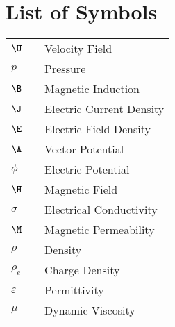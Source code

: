 \chapter*{List of Symbols}
\vspace{-1em}
\begin{table}[ht!]\begin{adjustbox}{max width=\TW}\begin{tabular}{ l c l }
$\U$                  & \hspace{3em} &    Velocity Field                \\
$p$                   & \hspace{3em} &    Pressure                      \\
$\B$                  & \hspace{3em} &    Magnetic Induction            \\
$\J$                  & \hspace{3em} &    Electric Current Density      \\
$\E$                  & \hspace{3em} &    Electric Field Density        \\
$\A$                  & \hspace{3em} &    Vector Potential              \\
$\phi$                & \hspace{3em} &    Electric Potential            \\
$\H$                  & \hspace{3em} &    Magnetic Field                \\
$\sigma$              & \hspace{3em} &    Electrical Conductivity       \\
$\M$                  & \hspace{3em} &    Magnetic Permeability         \\
$\rho$                & \hspace{3em} &    Density                       \\
$\rho_e$              & \hspace{3em} &    Charge Density                \\
$\varepsilon$         & \hspace{3em} &    Permittivity                  \\
$\mu$                 & \hspace{3em} &    Dynamic Viscosity             \\

\end{tabular}
\end{adjustbox}
\end{table}
